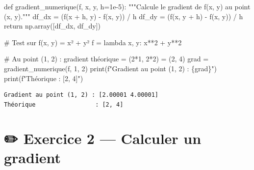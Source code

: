 \documentclass[
  french,
  11pt,
  a4paper,
]{scrbook}
\newenvironment{Shaded}{}{}
\newcommand{\BuiltInTok}[1]{\textcolor[rgb]{0.84,0.23,0.29}{#1}}
\newcommand{\CommentTok}[1]{\textcolor[rgb]{0.42,0.45,0.49}{#1}}
\newcommand{\ControlFlowTok}[1]{\textcolor[rgb]{0.84,0.23,0.29}{#1}}
\newcommand{\DecValTok}[1]{\textcolor[rgb]{0.00,0.36,0.77}{#1}}
\newcommand{\FloatTok}[1]{\textcolor[rgb]{0.00,0.36,0.77}{#1}}
\newcommand{\KeywordTok}[1]{\textcolor[rgb]{0.84,0.23,0.29}{#1}}
\newcommand{\NormalTok}[1]{\textcolor[rgb]{0.14,0.16,0.18}{#1}}
\newcommand{\OperatorTok}[1]{\textcolor[rgb]{0.14,0.16,0.18}{#1}}
\newcommand{\SpecialCharTok}[1]{\textcolor[rgb]{0.00,0.36,0.77}{#1}}
\newcommand{\SpecialStringTok}[1]{\textcolor[rgb]{0.01,0.18,0.38}{#1}}
\begin{document}
\begin{Shaded}
\begin{Highlighting}[]
\KeywordTok{def}\NormalTok{ gradient\_numerique(f, x, y, h}\OperatorTok{=}\FloatTok{1e{-}5}\NormalTok{):}
    \CommentTok{"""Calcule le gradient de f(x, y) au point (x, y)."""}
\NormalTok{    df\_dx }\OperatorTok{=}\NormalTok{ (f(x }\OperatorTok{+}\NormalTok{ h, y) }\OperatorTok{{-}}\NormalTok{ f(x, y)) }\OperatorTok{/}\NormalTok{ h}
\NormalTok{    df\_dy }\OperatorTok{=}\NormalTok{ (f(x, y }\OperatorTok{+}\NormalTok{ h) }\OperatorTok{{-}}\NormalTok{ f(x, y)) }\OperatorTok{/}\NormalTok{ h}
    \ControlFlowTok{return}\NormalTok{ np.array([df\_dx, df\_dy])}

\CommentTok{\# Test sur f(x, y) = x² + y²}
\NormalTok{f }\OperatorTok{=} \KeywordTok{lambda}\NormalTok{ x, y: x}\OperatorTok{**}\DecValTok{2} \OperatorTok{+}\NormalTok{ y}\OperatorTok{**}\DecValTok{2}

\CommentTok{\# Au point (1, 2) : gradient théorique = (2*1, 2*2) = (2, 4)}
\NormalTok{grad }\OperatorTok{=}\NormalTok{ gradient\_numerique(f, }\DecValTok{1}\NormalTok{, }\DecValTok{2}\NormalTok{)}
\BuiltInTok{print}\NormalTok{(}\SpecialStringTok{f"Gradient au point (1, 2) : }\SpecialCharTok{\{}\NormalTok{grad}\SpecialCharTok{\}}\SpecialStringTok{"}\NormalTok{)}
\BuiltInTok{print}\NormalTok{(}\SpecialStringTok{f"Théorique                 : [2, 4]"}\NormalTok{)}
\end{Highlighting}
\end{Shaded}

\begin{verbatim}
Gradient au point (1, 2) : [2.00001 4.00001]
Théorique                 : [2, 4]
\end{verbatim}

\section{✏️ Exercice 2 --- Calculer un
gradient}\label{exercice-2-calculer-un-gradient}
\end{document}
